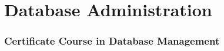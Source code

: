 \section{Database Administration}
\begin{frame}
	\frametitle{Certificate Course in Database Management }
\end{frame}